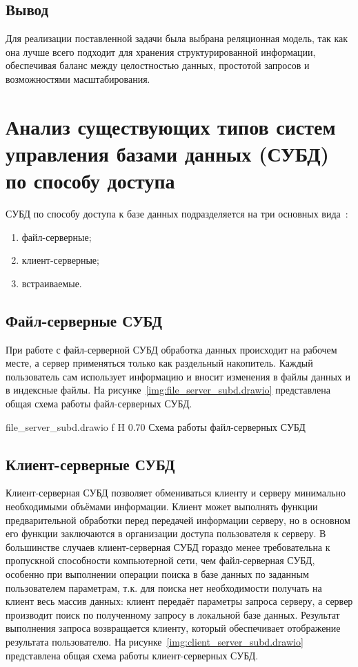 \subsection{Вывод}
Для реализации поставленной задачи была выбрана реляционная модель, так как она лучше всего 
подходит для хранения структурированной информации, обеспечивая баланс между целостностью данных, 
простотой запросов и возможностями масштабирования.

\section{Анализ существующих типов систем управления базами данных (СУБД) по способу доступа}

СУБД по способу доступа к базе данных подразделяется на три основных вида~\cite{SUDBTypes}:

\begin{enumerate}
    \item файл-серверные;
    \item клиент-серверные;
    \item встраиваемые.
\end{enumerate}

\subsection{Файл-серверные СУБД}

При работе с файл-серверной СУБД обработка данных происходит на
рабочем месте, а сервер применяться только как раздельный накопитель. 
Каждый пользователь сам использует информацию и вносит изменения в файлы
данных и в индексные файлы. На рисунке~\ref{img:file_server_subd.drawio}
представлена общая схема работы файл-серверных СУБД.

    {file_server_subd.drawio}
    {f}
    {H}
    {0.70\textwidth}
    {Схема работы файл-серверных СУБД}

\subsection{Клиент-серверные СУБД}

Клиент-серверная СУБД позволяет обмениваться клиенту и серверу минимально необходимыми объёмами информации. 
Клиент может выполнять функции предварительной обработки перед передачей информации серверу, но в основном 
его функции заключаются в организации доступа пользователя к серверу. В большинстве случаев клиент-серверная 
СУБД гораздо менее требовательна к пропускной способности компьютерной сети, чем файл-серверная СУБД, особенно 
при выполнении операции поиска в базе данных по заданным пользователем параметрам, т.к. для поиска нет необходимости 
получать на клиент весь массив данных: клиент передаёт параметры запроса серверу, а сервер производит поиск 
по полученному запросу в локальной базе данных. Результат выполнения запроса возвращается клиенту, 
который обеспечивает отображение результата пользователю. На рисунке~\ref{img:client_server_subd.drawio}
представлена общая схема работы клиент-серверных СУБД.

